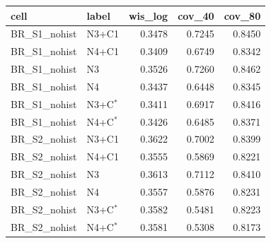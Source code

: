 \begin{tabular}{llrrr}
\toprule
cell & label & wis\_log & cov\_40 & cov\_80 \\
\midrule
BR\_S1\_nohist & N3+C1 & 0.3478 & 0.7245 & 0.8450 \\
BR\_S1\_nohist & N4+C1 & 0.3409 & 0.6749 & 0.8342 \\
BR\_S1\_nohist & N3 & 0.3526 & 0.7260 & 0.8462 \\
BR\_S1\_nohist & N4 & 0.3437 & 0.6448 & 0.8345 \\
BR\_S1\_nohist & N3+C$^{*}$ & 0.3411 & 0.6917 & 0.8416 \\
BR\_S1\_nohist & N4+C$^{*}$ & 0.3426 & 0.6485 & 0.8371 \\
BR\_S2\_nohist & N3+C1 & 0.3622 & 0.7002 & 0.8399 \\
BR\_S2\_nohist & N4+C1 & 0.3555 & 0.5869 & 0.8221 \\
BR\_S2\_nohist & N3 & 0.3613 & 0.7112 & 0.8410 \\
BR\_S2\_nohist & N4 & 0.3557 & 0.5876 & 0.8231 \\
BR\_S2\_nohist & N3+C$^{*}$ & 0.3582 & 0.5481 & 0.8223 \\
BR\_S2\_nohist & N4+C$^{*}$ & 0.3581 & 0.5308 & 0.8173 \\
\bottomrule
\end{tabular}
